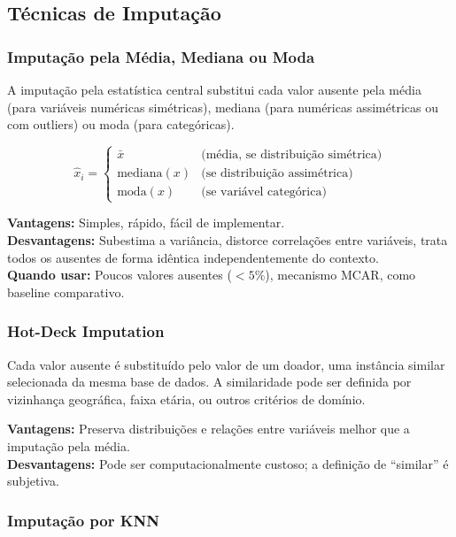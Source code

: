 \documentclass[12pt,a4paper]{article}
\begin{document}
\subsection{Técnicas de Imputação}

\subsubsection{Imputação pela Média, Mediana ou Moda}

A imputação pela estatística central substitui cada valor ausente pela média (para variáveis numéricas simétricas), mediana (para numéricas assimétricas ou com outliers) ou moda (para categóricas).

\[
\hat{x}_i = \begin{cases} \bar{x} & \text{(média, se distribuição simétrica)} \\ \text{mediana}(x) & \text{(se distribuição assimétrica)} \\ \text{moda}(x) & \text{(se variável categórica)} \end{cases}
\]

\textbf{Vantagens:} Simples, rápido, fácil de implementar.\\
\textbf{Desvantagens:} Subestima a variância, distorce correlações entre variáveis, trata todos os ausentes de forma idêntica independentemente do contexto.\\
\textbf{Quando usar:} Poucos valores ausentes ($< 5\%$), mecanismo MCAR, como baseline comparativo.

\subsubsection{Hot-Deck Imputation}

Cada valor ausente é substituído pelo valor de um doador, uma instância similar selecionada da mesma base de dados. A similaridade pode ser definida por vizinhança geográfica, faixa etária, ou outros critérios de domínio.

\textbf{Vantagens:} Preserva distribuições e relações entre variáveis melhor que a imputação pela média.\\
\textbf{Desvantagens:} Pode ser computacionalmente custoso; a definição de ``similar'' é subjetiva.

\subsubsection{Imputação por KNN}
\end{document}
